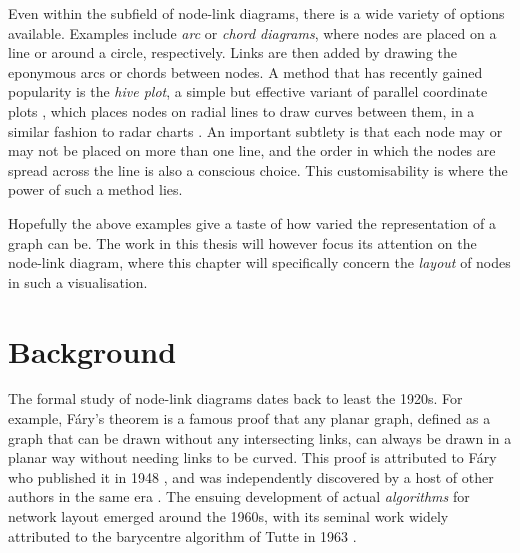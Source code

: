 Even within the subfield of node-link diagrams, there is a wide variety of options available.
Examples include \emph{arc} or \emph{chord diagrams}, where nodes are placed on a line or around a circle, respectively. Links are then added by drawing the eponymous arcs or chords between nodes.
A method that has recently gained popularity is the \emph{hive plot}, a simple but effective variant of parallel coordinate plots \cite{Krzywinski2012}, which places nodes on radial lines to draw curves between them, in a similar fashion to radar charts \cite{Porter2018}. An important subtlety is that each node may or may not be placed on more than one line, and the order in which the nodes are spread across the line is also a conscious choice. This customisability is where the power of such a method lies.

Hopefully the above examples give a taste of how varied the representation of a graph can be. The work in this thesis will however focus its attention on the node-link diagram, where this chapter will specifically concern the \emph{layout} of nodes in such a visualisation.

\section{Background}
\label{sec:nodes_background}
The formal study of node-link diagrams dates back to least the 1920s. For example, F\'ary's theorem is a famous proof that any planar graph, defined as a graph that can be drawn without any intersecting links, can always be drawn in a planar way without needing links to be curved. This proof is attributed to F\'ary who published it in 1948 \cite{Fary1948}, and was independently discovered by a host of other authors in the same era \cite{Steinitz1922, Wagner1936, Koebe1936, Stein1951}.
The ensuing development of actual \emph{algorithms} for network layout emerged around the 1960s, with its seminal work widely attributed to the barycentre algorithm of Tutte in 1963 \cite{Tutte1963}. 

